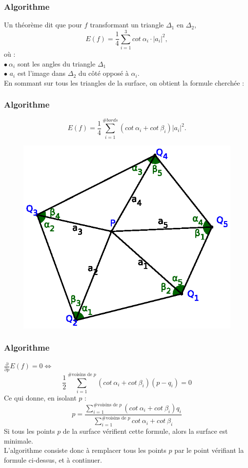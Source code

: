 \documentclass{beamer}
\begin{document}
\begin{frame}
\frametitle{Algorithme}
Un théorème dit que pour $f$ transformant un triangle $\Delta_1$ en $\Delta_2$, $$E(f) = \frac{1}{4}\sum_{i=1}^{3}cot\ \alpha_i\cdot |a_i|^2,$$ où :\\
$\bullet\ \alpha_i$ sont les angles du triangle $\Delta_1$\\
$\bullet$ $a_i$ est l'image dans $\Delta_2$ du côté opposé à $\alpha_i$.\\
\pause
En sommant sur tous les triangles de la surface, on obtient la formule cherchée : 
\end{frame}

\begin{frame}
\frametitle{Algorithme}
$$E(f) = \frac{1}{4}\sum_{i=1}^{\#bords} (cot\ \alpha_i + cot\ \beta_i) |a_i|^2.$$
\begin{figure}[h!]
      \centering 
      \includegraphics[scale=0.8]{6.eps}
\end{figure}
\end{frame}

\begin{frame}
\frametitle{Algorithme}
$\frac{\partial}{\partial p}E(f) = 0 \Longleftrightarrow$ \\
$$\frac{1}{2}\sum_{i=1}^{\#\text{voisins de }p} (cot\ \alpha_i + cot\ \beta_i) (p-q_i) = 0$$\pause
Ce qui donne, en isolant $p$ : \\
$$\boxed{p=\frac{\sum_{i=1}^{\#\text{voisins de }p}(cot\ \alpha_i + cot\ \beta_i) q_i}{\sum_{i=1}^{\#\text{voisins de }p}cot\ \alpha_i + cot\ \beta_i}}$$
Si tous les points $p$ de la surface vérifient cette formule, alors la surface est minimale.\\ \pause L'algorithme consiste donc à remplacer tous les points $p$ par le point vérifiant la formule ci-dessus, et à continuer.
\end{frame}
\end{document}
